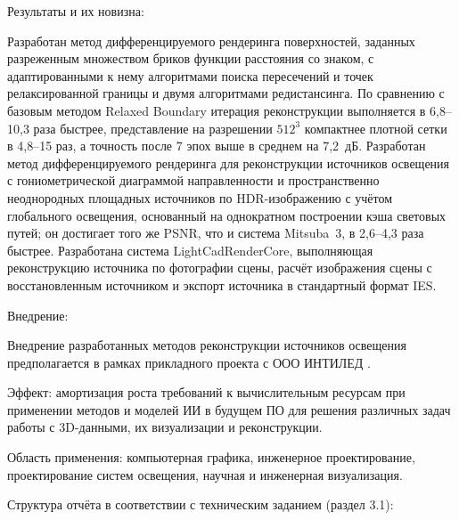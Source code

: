Результаты и их новизна:

Разработан метод дифференцируемого рендеринга поверхностей, заданных разреженным множеством бриков функции расстояния со знаком, с адаптированными к нему алгоритмами поиска пересечений и точек релаксированной границы и двумя алгоритмами редистансинга. По сравнению с базовым методом Relaxed Boundary итерация реконструкции выполняется в 6,8--10,3 раза быстрее, представление на разрешении $512^3$ компактнее плотной сетки в 4,8--15 раз, а точность после 7 эпох выше в среднем на 7,2~дБ. Разработан метод дифференцируемого рендеринга для реконструкции источников освещения с гониометрической диаграммой направленности и пространственно неоднородных площадных источников по HDR-изображению с учётом глобального освещения, основанный на однократном построении кэша световых путей; он достигает того же PSNR, что и система Mitsuba~3, в 2,6--4,3 раза быстрее. Разработана система LightCadRenderCore, выполняющая реконструкцию источника по фотографии сцены, расчёт изображения сцены с восстановленным источником и экспорт источника в стандартный формат IES.

Внедрение:

Внедрение разработанных методов реконструкции источников освещения предполагается в рамках прикладного проекта с ООО ИНТИЛЕД .

Эффект: амортизация роста требований к вычислительным ресурсам при применении методов и моделей ИИ в будущем ПО для решения различных задач работы с 3D-данными, их визуализации и реконструкции.

Область применения: компьютерная графика, инженерное проектирование, проектирование систем освещения, научная и инженерная визуализация.

Структура отчёта в соответствии с техническим заданием (раздел 3.1):

